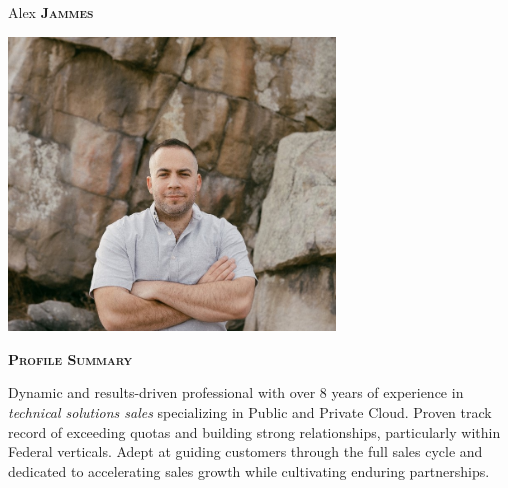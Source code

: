 \documentclass[11pt, a4paper]{article}
\newcommand{\headleft}[1]{\vspace*{3ex}\textsc{\textbf{#1}}\par%
    \vspace*{-1.5ex}\hrulefill\par\vspace*{0.7ex}}
\begin{document}
\setlength{\topskip}{0pt}
\setlength{\parindent}{0pt}
\setlength{\parskip}{0pt}
\setlength{\fboxsep}{0pt}
\pagestyle{empty}
\raggedbottom

\begin{minipage}[t]{0.28\textwidth} %
\colorbox{cvblue}{\begin{minipage}[t][5mm][t]{\textwidth}\null\hfill\null\end{minipage}}

\vspace{-.2ex} %
\colorbox{cvblue!90}{\color{white}  %
\textwidth\relax%
\begin{minipage}[t][293mm][t]{0.82\textwidth}
\raggedright
\vspace*{2.5ex}

\Large Alex \textbf{\textsc{Jammes}} \normalsize

\null\hfill\includegraphics[width=0.65\textwidth]{images/resume_profile_picture.jpg}\hfill\null

\vspace*{0.5ex} %

\headleft{Profile Summary}
Dynamic and results-driven professional with over 8 years of experience in \textit{ technical solutions sales} specializing in Public and Private Cloud. Proven track record of exceeding quotas and building strong relationships, particularly within Federal verticals. Adept at guiding customers through the full sales cycle and dedicated to accelerating sales growth while cultivating enduring partnerships.


\end{minipage}}
\end{minipage}
\end{document}
